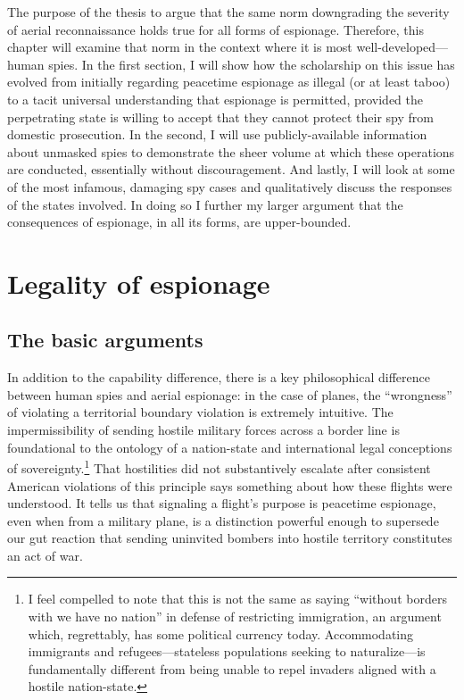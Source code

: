 \documentclass{report}
\begin{document}
\begin{refsegment}
The purpose of the thesis to argue that the same norm downgrading the severity of aerial reconnaissance holds true for all forms of espionage. Therefore, this chapter will examine that norm in the context where it is most well-developed---human spies. In the first section, I will show how the scholarship on this issue has evolved from initially regarding peacetime espionage as illegal (or at least taboo) to a tacit universal understanding that espionage is permitted, provided the perpetrating state is willing to accept that they cannot protect their spy from domestic prosecution. In the second, I will use publicly-available information about unmasked spies to demonstrate the sheer volume at which these operations are conducted, essentially without discouragement. And lastly, I will look at some of the most infamous, damaging spy cases and qualitatively discuss the responses of the states involved. In doing so I further my larger argument that the consequences of espionage, in all its forms, are upper-bounded.

\section{Legality of espionage}
\subsection{The basic arguments}
In addition to the capability difference, there is a key philosophical difference between human spies and aerial espionage: in the case of planes, the ``wrongness'' of violating a territorial boundary violation is extremely intuitive. The impermissibility of sending hostile military forces across a border line is foundational to the ontology of a nation-state and international legal conceptions of sovereignty.\footnote{I feel compelled to note that this is not the same as saying ``without borders with we have no nation'' in defense of restricting immigration, an argument which, regrettably, has some political currency today. Accommodating immigrants and refugees---stateless populations seeking to naturalize---is fundamentally different from being unable to repel invaders aligned with a hostile nation-state.} That hostilities did not substantively escalate after consistent American violations of this principle says something about how these flights were understood. It tells us that signaling a flight's purpose is peacetime espionage, even when from a military plane, is a distinction powerful enough to supersede our gut reaction that sending uninvited bombers into hostile territory constitutes an act of war.


\end{refsegment}
\end{document}
